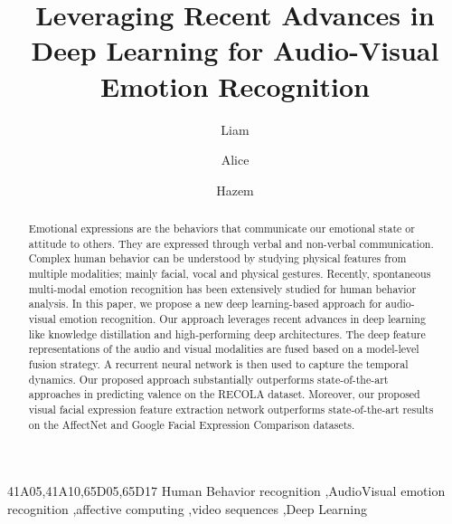 \documentclass[times,twocolumn,final,authoryear]{elsarticle}
\begin{document}
	
	
	
	
	\ifpreprint
	\setcounter{page}{1}
	\else
	\setcounter{page}{1}
	\fi
	
	\begin{frontmatter}
		
		\title{Leveraging Recent Advances in Deep Learning for Audio-Visual Emotion Recognition}
		
		\author[1]{Liam } 
		\author[2]{Alice } 
		\author[2]{Hazem }
		
		
		
		
		\address[1]{Powder AI Research}
		\address[2]{Universit\'e Paris-Est, LISSI, UPEC, 94400 Vitry sur Seine, France}
		
		
		\begin{abstract}
			Emotional expressions are the behaviors that communicate our emotional state or attitude to others. They are expressed through verbal and non-verbal communication. Complex human behavior can be understood by studying physical features from multiple modalities; mainly facial, vocal and physical gestures. Recently, spontaneous multi-modal emotion recognition has been extensively studied for human behavior analysis. In this paper, we propose a new deep learning-based approach for audio-visual emotion recognition. Our approach leverages recent advances in deep learning like knowledge distillation and high-performing deep architectures. The deep feature representations of the audio and visual modalities are fused based on a model-level fusion strategy. A recurrent neural network is then used to capture the temporal dynamics. Our proposed approach substantially outperforms state-of-the-art approaches in predicting valence on the RECOLA dataset. Moreover, our proposed visual facial expression feature extraction network outperforms state-of-the-art results on the AffectNet and Google Facial Expression Comparison datasets.
		\end{abstract}
		
		\begin{keyword}
			\MSC 41A05\sep 41A10\sep 65D05\sep 65D17
			\KWD  Human Behavior recognition  \sep AudioVisual emotion recognition \sep affective computing \sep video sequences \sep Deep Learning
			
\end{keyword}
		
	\end{frontmatter}
	
\end{document}
